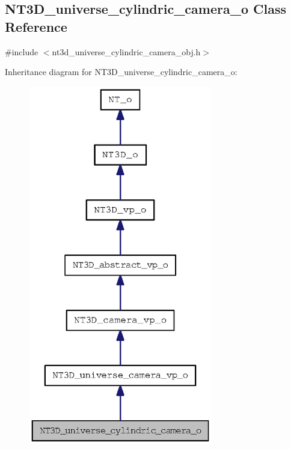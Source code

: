 \subsection{NT3D\_\-universe\_\-cylindric\_\-camera\_\-o Class Reference}
\label{class_n_t3_d__universe__cylindric__camera__o}


{\ttfamily \#include $<$nt3d\_\-universe\_\-cylindric\_\-camera\_\-obj.h$>$}



Inheritance diagram for NT3D\_\-universe\_\-cylindric\_\-camera\_\-o:
\nopagebreak
\begin{figure}[H]
\begin{center}
\leavevmode
\includegraphics[width=228pt]{class_n_t3_d__universe__cylindric__camera__o__inherit__graph}
\end{center}
\end{figure}


